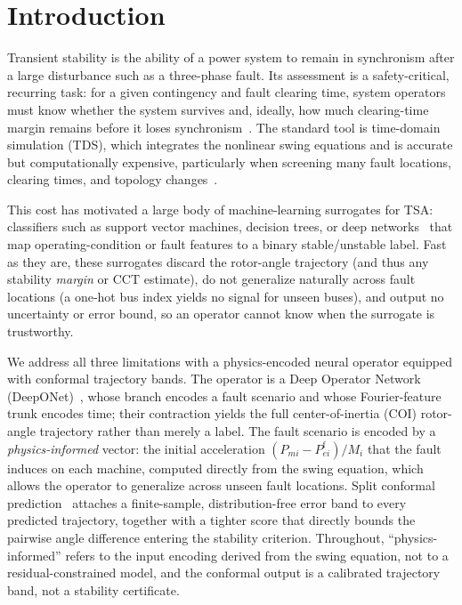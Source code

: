 \documentclass[5p,times]{elsarticle}
\begin{document}
\section{Introduction}
Transient stability is the ability of a power system to remain in synchronism
after a large disturbance such as a three-phase fault. Its assessment is a safety-critical,
recurring task: for a given contingency and fault clearing time, system operators must know
whether the system survives and, ideally, how much clearing-time margin remains before it loses
synchronism~\cite{sauer1998dynamics, kundur1994power}. The standard tool is time-domain
simulation (TDS), which integrates the nonlinear swing equations and is accurate but
computationally expensive, particularly when screening many fault locations, clearing times, and
topology changes~\cite{stott1979power}.

This cost has motivated a large body of machine-learning surrogates for TSA: classifiers such as
support vector machines, decision trees, or deep networks~\cite{alimi2020review} that map
operating-condition or fault features to a binary stable/unstable label. Fast as they are, these
surrogates discard the rotor-angle trajectory (and thus any stability \emph{margin} or CCT
estimate), do not generalize naturally across fault locations (a one-hot bus index yields no
signal for unseen buses), and output no uncertainty or error bound, so an operator cannot know
when the surrogate is trustworthy.

We address all three limitations with a physics-encoded neural operator equipped with conformal
trajectory bands. The operator is a Deep Operator Network (DeepONet)~\cite{lu2021learning}, whose
branch encodes a fault scenario and whose Fourier-feature trunk encodes time; their contraction
yields the full center-of-inertia (COI) rotor-angle trajectory rather than merely a label. The
fault scenario is encoded by a \emph{physics-informed} vector: the initial acceleration
$(P_{mi}-P_{ei}^{\mathrm{f}})/M_i$ that the fault induces on each machine, computed directly from
the swing equation, which allows the operator to generalize across unseen fault locations. Split
conformal prediction~\cite{lei2018distribution} attaches a finite-sample, distribution-free error
band to every predicted trajectory, together with a tighter score that directly bounds the
pairwise angle difference entering the stability criterion. Throughout, ``physics-informed''
refers to the input encoding derived from the swing equation, not to a residual-constrained model,
and the conformal output is a calibrated trajectory band, not a stability certificate.
\end{document}
